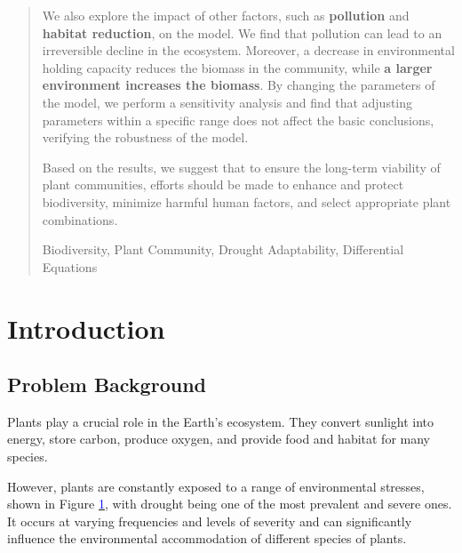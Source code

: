 \documentclass{mcmthesis}
\begin{document}
\begin{abstract}
We also explore the impact of other factors, such as \textbf{pollution} and \textbf{habitat reduction}, on the model. We find that pollution can lead to an irreversible decline in the ecosystem. Moreover, a decrease in environmental holding capacity reduces the biomass in the community, while \textbf{a larger environment increases the biomass}. By changing the parameters of the model, we perform a sensitivity analysis and find that adjusting parameters within a specific range does not affect the basic conclusions, verifying the robustness of the model.\par
 Based on the results, we suggest that to ensure the long-term viability of plant communities, efforts should be made to enhance and protect biodiversity, minimize harmful human factors, and select appropriate plant combinations. \par

\begin{keywords}
Biodiversity, Plant Community, Drought Adaptability, Differential Equations 
\end{keywords}

\end{abstract}

\maketitle

\thispagestyle{empty}
\tableofcontents


\newpage

\section{Introduction}

\subsection{Problem Background}

\indent

Plants play a crucial role in the Earth's ecosystem. They convert sunlight into energy, store carbon, produce oxygen, and provide food and habitat for many species. 

However, plants are constantly exposed to a range of environmental stresses, shown in Figure \hyperref[fig:grassland]{\textcolor{blue}{1}}, with drought being one of the most prevalent and severe ones. It occurs at varying frequencies and levels of severity and can significantly influence the environmental accommodation of different species of plants. 
\end{document}

